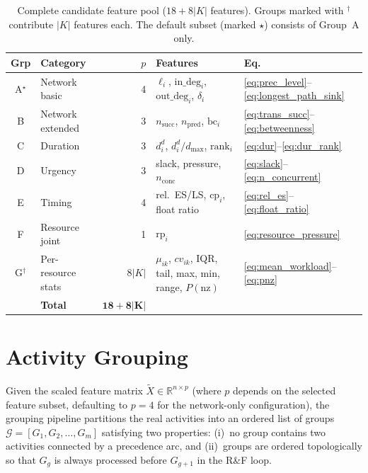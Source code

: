 \begin{table}[htbp]
\centering
\renewcommand{\arraystretch}{1.30}
\caption{Complete candidate feature pool ($18 + 8|K|$ features).
         Groups marked with $^{\dagger}$ contribute $|K|$
         features each. The default subset (marked $\star$)
         consists of Group~A only.}
\label{tab:all_features}
\begin{tabular}{c l r l l}
\hline
\textbf{Grp} & \textbf{Category} & $p$ &
\textbf{Features} & \textbf{Eq.} \\
\hline
A$^{\star}$ & Network basic
    & 4 & $\ell_i$, $\mathrm{in\_deg}_i$,
          $\mathrm{out\_deg}_i$, $\delta_i$
    & \eqref{eq:prec_level}--\eqref{eq:longest_path_sink} \\
B & Network extended
    & 3 & $n_{\mathrm{succ}}$, $n_{\mathrm{pred}}$,
          $\mathrm{bc}_i$
    & \eqref{eq:trans_succ}--\eqref{eq:betweenness} \\
C & Duration
    & 3 & $d_i^d$, $d_i^d/d_{\max}$,
          $\mathrm{rank}_i$
    & \eqref{eq:dur}--\eqref{eq:dur_rank} \\
D & Urgency
    & 3 & slack, pressure, $n_{\mathrm{conc}}$
    & \eqref{eq:slack}--\eqref{eq:n_concurrent} \\
E & Timing
    & 4 & rel.\ ES/LS, $\mathrm{cp}_i$,
          float ratio
    & \eqref{eq:rel_es}--\eqref{eq:float_ratio} \\
F & Resource joint
    & 1 & $\mathrm{rp}_i$
    & \eqref{eq:resource_pressure} \\
G$^{\dagger}$ & Per-resource stats
    & $8|K|$ & $\mu_{ik}$, $cv_{ik}$,
               IQR, tail, max, min,
               range, $P(\text{nz})$
    & \eqref{eq:mean_workload}--\eqref{eq:pnz} \\
\hline
 & \textbf{Total} & $\mathbf{18{+}8|K|}$ & & \\
\hline
\end{tabular}
\end{table}

\section{Activity Grouping}
\label{sec:grouping}
Given the scaled feature matrix $\tilde{X} \in \mathbb{R}^{n
\times p}$ (where $p$ depends on the selected feature subset,
defaulting to $p=4$ for the network-only configuration), the
grouping pipeline partitions the real activities into an ordered
list of groups $\mathcal{G} = [G_1, G_2, \ldots, G_m]$ satisfying
two properties: (i)~no group contains two activities connected by
a precedence arc, and (ii)~groups are ordered topologically so
that $G_g$ is always processed before $G_{g+1}$ in the R\&F loop.
